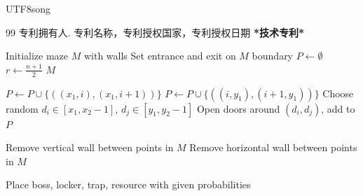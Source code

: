 \documentclass[10.5pt,compsoc]{CjC}
\theoremstyle{mystyle}
\begin{document}
\begin{CJK*}{UTF8}{song}
\begin{thebibliography}{99}
专利拥有人. 专利名称，专利授权国家，专利授权日期
\textbf{*技术专利*}
  \end{thebibliography}

\begin{strip}
\end{strip}



\begin{algorithm}
\caption{Maze Generation}
\begin{algorithmic}[1]
    \State Initialize maze $M$ with walls
    \State Set entrance and exit on $M$ boundary
    \State $P \gets \emptyset$
    \State $r \gets \frac{n+1}{2}$
    \State {}
    \State {}
    \State {}
    \State \Return $M$
\EndFunction

            \State $P \gets P \cup \{((x_1,i),(x_1,i+1))\}$
        \EndFor
        \State \Return
    \EndIf
            \State $P \gets P \cup \{((i,y_1),(i+1,y_1))\}$
        \EndFor
        \State \Return
    \EndIf
    \State Choose random $d_i \in [x_1,x_2-1]$, $d_j \in [y_1,y_2-1]$
    \State Open doors around $(d_i,d_j)$, add to $P$
    \State {}
    \State {}
    \State {}
    \State {}
\EndFunction

            \State Remove vertical wall between points in $M$
        \Else
            \State Remove horizontal wall between points in $M$
        \EndIf
    \EndFor
\EndFunction

        \State Place boss, locker, trap, resource with given probabilities
    \EndFor
\EndFunction
\end{algorithmic}
\end{algorithm}




\end{CJK*}
\end{document}
